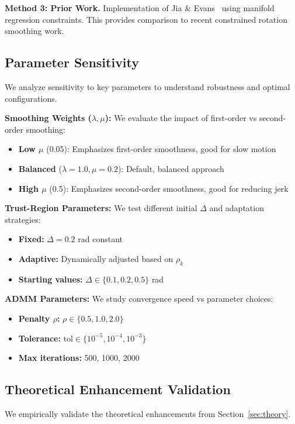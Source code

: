 \textbf{Method 3: Prior Work.} Implementation of Jia & Evans~\cite{jia_evans} using manifold regression constraints. This provides comparison to recent constrained rotation smoothing work.

\subsection{Parameter Sensitivity}

We analyze sensitivity to key parameters to understand robustness and optimal configurations.

\textbf{Smoothing Weights ($\lambda, \mu$):} We evaluate the impact of first-order vs second-order smoothing:
\begin{itemize}
\item \textbf{Low $\mu$} (0.05): Emphasizes first-order smoothness, good for slow motion
\item \textbf{Balanced} ($\lambda=1.0, \mu=0.2$): Default, balanced approach
\item \textbf{High $\mu$} (0.5): Emphasizes second-order smoothness, good for reducing jerk
\end{itemize}

\textbf{Trust-Region Parameters:} We test different initial $\Delta$ and adaptation strategies:
\begin{itemize}
\item \textbf{Fixed:} $\Delta = 0.2$ rad constant
\item \textbf{Adaptive:} Dynamically adjusted based on $\rho_k$
\item \textbf{Starting values:} $\Delta \in \{0.1, 0.2, 0.5\}$ rad
\end{itemize}

\textbf{ADMM Parameters:} We study convergence speed vs parameter choices:
\begin{itemize}
\item \textbf{Penalty $\rho$:} $\rho \in \{0.5, 1.0, 2.0\}$
\item \textbf{Tolerance:} $\text{tol} \in \{10^{-5}, 10^{-4}, 10^{-3}\}$
\item \textbf{Max iterations:} 500, 1000, 2000
\end{itemize}

\subsection{Theoretical Enhancement Validation}

We empirically validate the theoretical enhancements from Section~\ref{sec:theory}.

